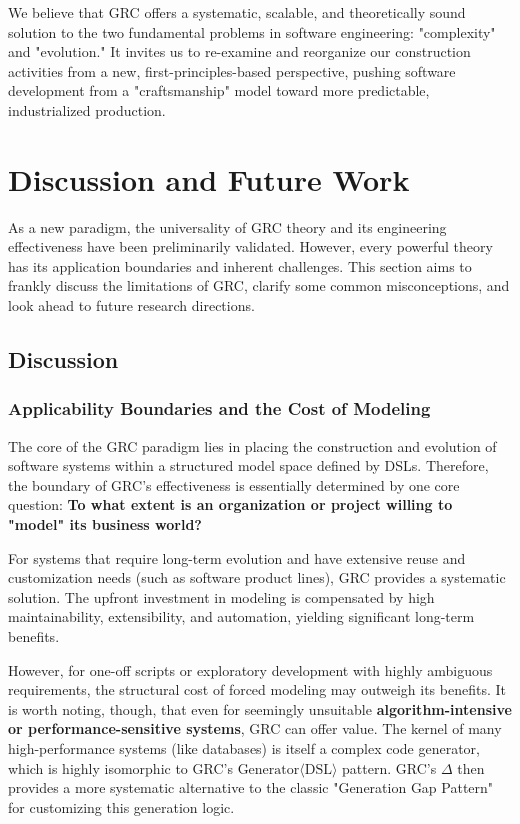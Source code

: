 \documentclass[11pt]{article}
\begin{document}
We believe that GRC offers a systematic, scalable, and theoretically sound solution to the two fundamental problems in software engineering: "complexity" and "evolution." It invites us to re-examine and reorganize our construction activities from a new, first-principles-based perspective, pushing software development from a "craftsmanship" model toward more predictable, industrialized production.

\section{Discussion and Future Work}

As a new paradigm, the universality of GRC theory and its engineering effectiveness have been preliminarily validated. However, every powerful theory has its application boundaries and inherent challenges. This section aims to frankly discuss the limitations of GRC, clarify some common misconceptions, and look ahead to future research directions.

\subsection{Discussion}

\subsubsection{Applicability Boundaries and the Cost of Modeling}

The core of the GRC paradigm lies in placing the construction and evolution of software systems within a structured model space defined by DSLs. Therefore, the boundary of GRC's effectiveness is essentially determined by one core question: \textbf{To what extent is an organization or project willing to "model" its business world?}

For systems that require long-term evolution and have extensive reuse and customization needs (such as software product lines), GRC provides a systematic solution. The upfront investment in modeling is compensated by high maintainability, extensibility, and automation, yielding significant long-term benefits.

However, for one-off scripts or exploratory development with highly ambiguous requirements, the structural cost of forced modeling may outweigh its benefits. It is worth noting, though, that even for seemingly unsuitable \textbf{algorithm-intensive or performance-sensitive systems}, GRC can offer value. The kernel of many high-performance systems (like databases) is itself a complex code generator, which is highly isomorphic to GRC's $\text{Generator}\langle\text{DSL}\rangle$ pattern. GRC's $\Delta$ then provides a more systematic alternative to the classic "Generation Gap Pattern" for customizing this generation logic.
\end{document}
